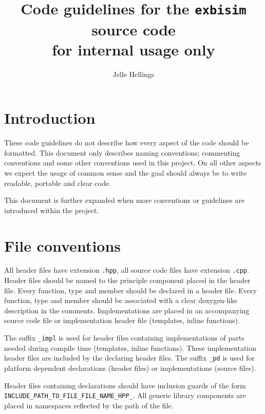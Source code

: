 \documentclass{article}
\title{Code guidelines for the {\tt exbisim} source code\\{\normalsize for internal usage only}}
\author{Jelle Hellings}
\begin{document}
\maketitle

\section{Introduction}
These code guidelines do not describe how every aspect of the code should be formatted. This document only describes naming conventions; commenting conventions and some other conventions used in this project. On all other aspects we expect the usage of common sense and the goal should always be to write readable, portable and clear code.
 
This document is further expanded when more conventions or guidelines are introduced within the project.

\section{File conventions}
All header files have extension {\tt .hpp}, all source code files have extension {\tt .cpp}. Header files should be named to the principle component placed in the header file. Every function, type and member should be declared in a header file. Every function, type and member should be associated with a clear doxygen-like description in the comments. Implementations are placed in an accompanying source code file or implementation header file (templates, inline functions).

The suffix {\tt \_impl} is used for header files containing implementations of parts needed during compile time (templates, inline functions). These implementation header files are included by the declaring header files. The suffix {\tt \_pd} is used for platform dependent declarations (header files) or implementations (source files). 

Header files containing declarations should have inclusion guards of the form {\tt INCLUDE\_PATH\_TO\_FILE\_FILE\_NAME\_HPP\_}. All generic library components are placed in namespaces reflected by the path of the file.
\end{document}
